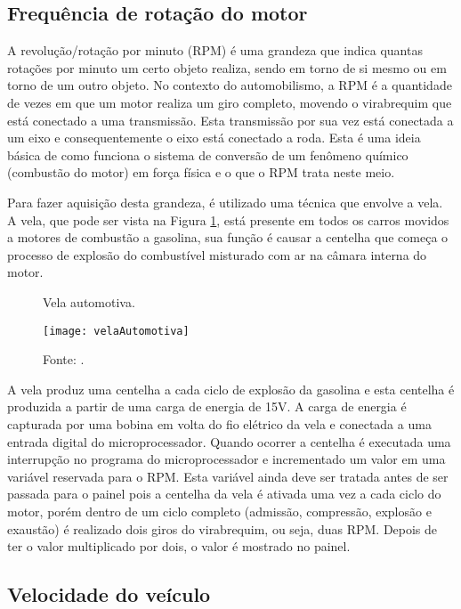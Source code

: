 \subsection{Frequência de rotação do motor}

A revolução/rotação por minuto (RPM) é uma grandeza que indica quantas rotações por minuto um certo objeto realiza, sendo em torno de si mesmo ou em torno de um outro objeto. No contexto do automobilismo, a RPM é a quantidade de vezes em que um motor realiza um giro completo, movendo o virabrequim que está conectado a uma transmissão. Esta transmissão por sua vez está conectada a um eixo e consequentemente o eixo está conectado a roda. Esta é uma ideia básica de como funciona o sistema de conversão de um fenômeno químico (combustão do motor) em força física e o que o RPM trata neste meio.

Para fazer aquisição desta grandeza, é utilizado uma técnica que envolve a vela. A vela, que pode ser vista na Figura \ref{fig:vela}, está presente em todos os carros movidos a motores de combustão a gasolina, sua função é causar a centelha que começa o processo de explosão do combustível misturado com ar na câmara interna do motor.       

\begin{figure}[!htb]
	\centering
		\caption{Vela automotiva.}
		\texttt{[image: velaAutomotiva]} 
		\caption*{Fonte: \cite{vela}.}
		\label{fig:vela}
\end{figure} 

A vela produz uma centelha a cada ciclo de explosão da gasolina e esta centelha é produzida a partir de uma carga de energia de 15V. A carga de energia é capturada por uma bobina em volta do fio elétrico da vela e conectada a uma entrada digital do microprocessador. Quando ocorrer a centelha é executada uma interrupção no programa do microprocessador e incrementado um valor em uma variável reservada para o RPM. Esta variável ainda deve ser tratada antes de ser passada para o painel pois a centelha da vela é ativada uma vez a cada ciclo do motor, porém dentro de um ciclo completo (admissão, compressão, explosão e exaustão) é realizado dois giros do virabrequim, ou seja, duas RPM. Depois de ter o valor multiplicado por dois, o valor é mostrado no painel. 

\subsection{Velocidade do veículo}

